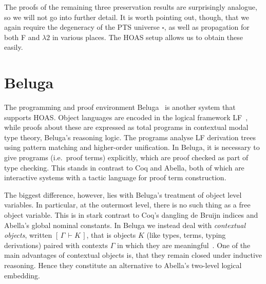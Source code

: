 \documentclass[a4paper,UKenglish]{lipics-v2016}
\newcommand{\ms}{\,}
\newcommand{\SysL}{$\lambda2$\xspace}
\newcommand{\Typ}{\ensuremath{\square}}
\theoremstyle{plain}
\begin{document}
The proofs of the remaining three preservation results are surprisingly analogue, so we will not go into further detail.
It is worth pointing out, though, that we again require the degeneracy of the PTS universe $\Typ$, as well as propagation for both F and \SysL in various places.
The HOAS setup allows us to obtain these easily.

\section{Beluga}
\label{sec:beluga}

\newcommand{\D}{\mathcal{D}}
\newcommand{\bc}[2]{\ensuremath{[\,#1\,\vdash #2\,]}}
\newcommand{\sof}{\ensuremath{\!:\ms}}
\newcommand{\ssep}{\ensuremath{,\ms}}

The programming and proof environment Beluga~\cite{Pientka:FLOPS10,Pientka:CADE15} is another system that supports HOAS.
Object languages are encoded in the logical framework LF~\cite{Harper93jacm}, while proofs about these are expressed as total programs in contextual modal type theory, Beluga's reasoning logic.
The programs analyse LF derivation trees using pattern matching and higher-order unification.
In Beluga, it is necessary to give programs (i.e.\ proof terms) explicitly, which are proof checked as part of type checking.
This stands in contrast to Coq and Abella, both of which are interactive systems with a tactic language for proof term construction.


The biggest difference, however, lies with Beluga's treatment of object level variables.
In particular, at the outermost level, there is no such thing as a free object variable.
This is in stark contrast to Coq's dangling de Bruijn indices and Abella's global nominal constants.
In Beluga we instead deal with \emph{contextual objects}, written $\bc{\Gamma}{K}$, that is objects $K$ (like types, terms, typing derivations) paired with contexts $\Gamma$ in which they are meaningful~\cite{Nanevski:ICML05,Pientka:POPL08}.
One of the main advantages of contextual objects is, that they remain closed under inductive reasoning.
Hence they constitute an alternative to Abella's two-level logical embedding.
\end{document}
